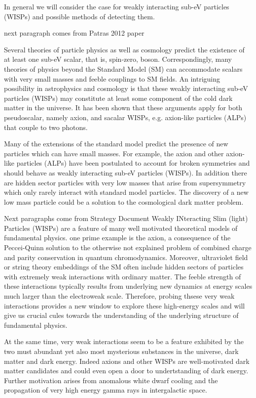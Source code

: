 \documentclass[11pt]{book}
\begin{document}
In general we will consider the case for weakly interacting sub-eV particles (WISPs) and possible methods of detecting them.

{\color{blue} next paragraph comes from Patras 2012 paper}

Several theories of particle physics as well as cosmology predict the existence of at least one sub-eV scalar, that is, spin-zero, boson. Correspondingly, many theories of physics beyond the Standard Model (SM) can accommodate scalars with very small masses and feeble couplings to SM fields. An  intriguing possibility in astrophysics and cosmology is that these weakly interacting sub-eV particles (WISPs) may constitute at least some component of the cold dark matter in the universe. It has been shown that these arguments apply for both pseudoscalar, namely axion, and sacalar WISPs, e.g. axion-like particles (ALPs) that couple to two photons.

Many of the extensions of the standard model predict the presence of new particles which can have small masses. For example, the axion and other axion-like particles (ALPs) have been postulated to account for broken symmetries and should behave as weakly interacting sub-eV particles (WISPs). In addition there are hidden sector particles with very low masses that arise from supersymmetry which only rarely interact with standard model particles. The discovery of a new low mass particle  could be a solution to the cosmological dark matter problem.

{\color{blue} Next paragraphs come from Strategy Document}
Weakly INteracting Slim (light) Particles (WISPs) are a feature of many well motivated theoretical models of fundamental physics. one prime example is the axion, a consequence of the Peccei-Quinn solution to the otherwise not explained problem of combined charge and parity conservation in quantum chromodynamics. Moreover, ultraviolet field or string theory embeddings of the SM often include hidden sectors of particles with extremely weak interactions with ordinary matter. The feeble strength of these interactions typically results from underlying new dynamics at energy scales much larger than the electroweak scale. Therefore, probing thsese very weak interactions provides a new window to explore these high-energy scales and will give us crucial cules towards the understanding of the underlying structure of fundamental physics.

At the same time, very weak interactions seem to be a feature exhibited by the two must abundant yet also most mysterious substances in the universe, dark matter and dark energy. Indeed axions and other WISPs are well-motivated dark matter candidates and could even open a door to undertstanding of dark energy. Further motivation arises from anomalous white dwarf cooling and the propagation of very high energy gamma rays in intergalactic space.
\end{document}
